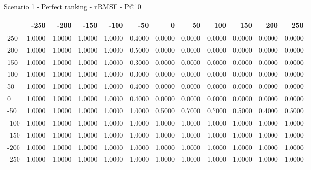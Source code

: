 Scenario 1 - Perfect ranking - nRMSE - P@10
\begin{tabular}{lrrrrrrrrrrr}
\toprule
{} &   -250 &   -200 &   -150 &   -100 &   -50  &    0   &    50  &    100 &    150 &    200 &    250 \\
\midrule
 250 & 1.0000 & 1.0000 & 1.0000 & 1.0000 & 0.4000 & 0.0000 & 0.0000 & 0.0000 & 0.0000 & 0.0000 & 0.0000 \\
 200 & 1.0000 & 1.0000 & 1.0000 & 1.0000 & 0.5000 & 0.0000 & 0.0000 & 0.0000 & 0.0000 & 0.0000 & 0.0000 \\
 150 & 1.0000 & 1.0000 & 1.0000 & 1.0000 & 0.3000 & 0.0000 & 0.0000 & 0.0000 & 0.0000 & 0.0000 & 0.0000 \\
 100 & 1.0000 & 1.0000 & 1.0000 & 1.0000 & 0.3000 & 0.0000 & 0.0000 & 0.0000 & 0.0000 & 0.0000 & 0.0000 \\
 50  & 1.0000 & 1.0000 & 1.0000 & 1.0000 & 0.4000 & 0.0000 & 0.0000 & 0.0000 & 0.0000 & 0.0000 & 0.0000 \\
 0   & 1.0000 & 1.0000 & 1.0000 & 1.0000 & 0.4000 & 0.0000 & 0.0000 & 0.0000 & 0.0000 & 0.0000 & 0.0000 \\
-50  & 1.0000 & 1.0000 & 1.0000 & 1.0000 & 1.0000 & 0.5000 & 0.7000 & 0.7000 & 0.5000 & 0.4000 & 0.5000 \\
-100 & 1.0000 & 1.0000 & 1.0000 & 1.0000 & 1.0000 & 1.0000 & 1.0000 & 1.0000 & 1.0000 & 1.0000 & 1.0000 \\
-150 & 1.0000 & 1.0000 & 1.0000 & 1.0000 & 1.0000 & 1.0000 & 1.0000 & 1.0000 & 1.0000 & 1.0000 & 1.0000 \\
-200 & 1.0000 & 1.0000 & 1.0000 & 1.0000 & 1.0000 & 1.0000 & 1.0000 & 1.0000 & 1.0000 & 1.0000 & 1.0000 \\
-250 & 1.0000 & 1.0000 & 1.0000 & 1.0000 & 1.0000 & 1.0000 & 1.0000 & 1.0000 & 1.0000 & 1.0000 & 1.0000 \\
\bottomrule
\end{tabular}

